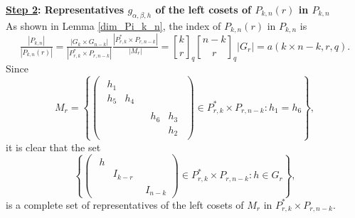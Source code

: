 \documentclass[reqno]{amsart}
\theoremstyle{definition}
\theoremstyle{remark}
\numberwithin{equation}{section}
\newcommand{\stirling}[2]{\genfrac{[}{]}{0pt}{1}{#1}{#2}}
\newcommand{\bbsm}{\left (\begin{smallmatrix}}      \newcommand{\besm}{\end{smallmatrix}\right )}
\begin{document}

\noindent \textbf{\underline{Step 2}: Representatives $g_{\alpha,\beta, h}$ of the left cosets of $P_{k,n}(r)$ in $P_{k,n}$} \hfill \\

As shown in Lemma \ref{dim_Pi_k_n}, the index of $P_{k,n}(r)$ in $P_{k,n}$ is
\[\tfrac{|P_{k,n}|}{|P_{k,n}(r)|}=\tfrac{|G_k \times G_{n-k}|}{|P^*_{r,k} \times P_{r,n-k}|} \tfrac{|P^*_{r,k} \times P_{r,n-k}|}{|M_r|}
=\stirling{k}{r}_q \stirling{n-k}{r}_q |G_r|=a(k \times n-k,r,q).\]
Since 
\[M_r=\left\{ \bbsm \begin{smallmatrix}
h_1 &\\h_5 &h_4 \end{smallmatrix} & \\ & \begin{smallmatrix}
h_6 &h_3\\ &h_2 \end{smallmatrix}\besm  \in P^*_{r,k} \times P_{r,n-k} \colon h_1=h_6\right\}, \]
it is clear that the set
\[ \left\{ \bbsm \begin{smallmatrix}
h &\\ &I_{k-r} \end{smallmatrix} & \ \\ & I_{n-k} \besm  \in P^*_{r,k} \times P_{r,n-k} \colon h \in G_r\right\}, \]
is a complete set of representatives of the left cosets of $M_r$ in $P^*_{r,k} \times P_{r,n-k}$.\\
\end{document}
